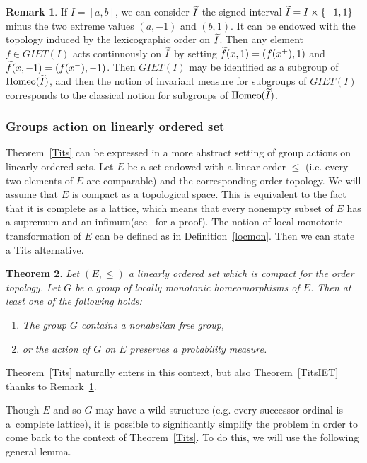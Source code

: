 \documentclass[10pt]{amsart}
\newtheorem{theo}{Theorem}[section]
\theoremstyle{definition}\newtheorem{defi}[theo]{Definition}\newtheorem{rema}[theo]{Remark}\newtheorem{exam}[theo]{Example}\newtheorem{exem}[theo]{Example}\newtheorem{nota}[theo]{Notation}
\DeclareMathOperator{\Homeo}{Homeo}
\let\oldtilde\tilde
\renewcommand*{\tilde}[1]{\mathchoice{\widetilde{#1}}{\widetilde{#1}}{\oldtilde{#1}}{\oldtilde{#1}}}
\begin{document}
\begin{rema}\label{lexico}
If $I=[a,b]$, we can consider $\tilde{I}$ the signed interval $\tilde{I}=I\times \{-1,1\}$ minus the two extreme values $(a,-1)$ and $(b,1)$. It can be endowed with the topology induced by the lexicographic order on $\tilde{I}$. Then any element $f\in \mathit{GIET}(I)$ acts continuously on $\tilde{I}$ by setting $\tilde{f}(x,1)=(f(x^+),1)$ and $\tilde{f}(x,-1)=(f(x^-),-1)$. Then $\mathit{GIET}(I)$ may be identified as a subgroup of $\Homeo(\tilde{I})$, and then the notion of invariant measure for subgroups of $\mathit{GIET}(I)$ corresponds to the classical notion for subgroups of $\Homeo(\tilde{I})$.
\end{rema}

\subsubsection*{Groups action on linearly ordered set} Theorem~\ref{Tits} can be expressed in a more abstract setting of group actions on linearly ordered sets. Let $E$ be a set endowed with a linear order $\leq$ (i.e. every two elements of $E$ are comparable) and the corresponding order topology. We will assume that $E$ is compact as a topological space. This is equivalent to the fact that it is complete as a lattice, which means that every nonempty subset of $E$ has a supremum and an infimum(see~\cite[Chapitre~III, Theorem~9]{B} for a proof). The notion of local monotonic transformation of $E$ can be defined as in Definition~\ref{locmon}. Then we can state a Tits alternative.

\begin{theo}\label{TitsLinOrd}
Let $(E,\leq)$ a linearly ordered set which is compact for the order topology. Let $G$ be a group of locally monotonic homeomorphisms of $E$. Then at least one of the following holds:
\begin{enumerate}
\item\label{theo1.13.1} The group $G$ contains a nonabelian free group,
\item\label{theo1.13.2} or the action of $G$ on $E$ preserves a probability measure.
\end{enumerate}
\end{theo}

Theorem~\ref{Tits} naturally enters in this context, but also Theorem~\ref{TitsIET} thanks to Remark~\ref{lexico}.

Though $E$ and so $G$ may have a wild structure (e.g. every successor ordinal is a~complete lattice), it is possible to significantly simplify the problem in order to come back to the context of Theorem~\ref{Tits}. To do this, we will use the following general lemma.
\end{document}
